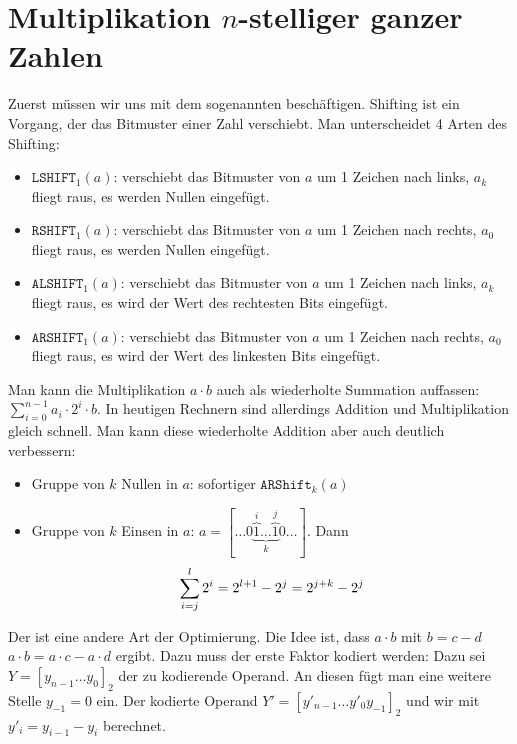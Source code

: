 \section{Multiplikation $n$-stelliger ganzer Zahlen}

Zuerst müssen wir uns mit dem sogenannten  beschäftigen. Shifting ist ein Vorgang, der das Bitmuster einer Zahl verschiebt. Man unterscheidet 4 Arten des Shifting:
\begin{itemize}
	\item {} $\texttt{LSHIFT}_1(a)$: verschiebt das Bitmuster von $a$ um 1 Zeichen nach links, $a_k$ fliegt raus, es werden Nullen eingefügt.
	\item {} $\texttt{RSHIFT}_1(a)$: verschiebt das Bitmuster von $a$ um 1 Zeichen nach rechts, $a_0$ fliegt raus, es werden Nullen eingefügt.
	\item {} $\texttt{ALSHIFT}_1(a)$: verschiebt das Bitmuster von $a$ um 1 Zeichen nach links, $a_k$ fliegt raus, es wird der Wert des rechtesten Bits eingefügt.
	\item {} $\texttt{ARSHIFT}_1(a)$: verschiebt das Bitmuster von $a$ um 1 Zeichen nach rechts, $a_0$ fliegt raus, es wird der Wert des linkesten Bits eingefügt.
\end{itemize}

Man kann die Multiplikation $a\cdot b$ auch als wiederholte Summation auffassen: $\sum\limits_{i=0}^{n-1} a_i\cdot 2^i\cdot b$. In heutigen Rechnern sind allerdings Addition und Multiplikation gleich schnell. Man kann diese wiederholte Addition aber auch deutlich verbessern:
\begin{itemize}
	\item Gruppe von $k$ Nullen in $a$: sofortiger $\texttt{ARShift}_k(a)$
	\item Gruppe von $k$ Einsen in $a$: $a=[\dots 0\underbrace{\overbrace{1}^{i}\dots\overbrace{1}^{j}}_k0\dots]$. Dann
	\begin{align}
		\sum_{i=j}^{l} 2^i = 2^{l+1}-2^j=2^{j+k}-2^j\notag
	\end{align}
\end{itemize}

Der  ist eine andere Art der Optimierung. Die Idee ist, dass $a\cdot b$ mit $b=c-d$ $a\cdot b=a\cdot c-a\cdot d$ ergibt. Dazu muss der erste Faktor kodiert werden: Dazu sei $Y=[y_{n-1}\dots y_0]_2$ der zu kodierende Operand. An diesen fügt man eine weitere Stelle $y_{-1}=0$ ein. Der kodierte Operand $Y'=[y'_{n-1}\dots y'_0y_{-1}]_2$ und wir mit $y'_i=y_{i-1}-y_i$ berechnet.

